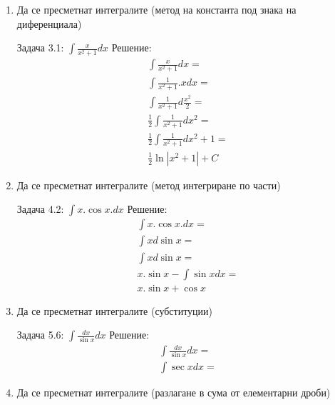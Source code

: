 \documentclass[a4paper, 20pt, fleqn, border=2pt]{article}
\begin{document}
\begin{enumerate}
    \item Да се пресметнат интегралите (метод на константа под знака на диференциала)
\par
\par

Задача 3.1: $\int\frac{x}{x^2 + 1}dx$
Решение:
\begin{equation}
\begin{split}
    \int\frac{x}{x^2 + 1}dx = \\
    \int\frac{1}{x^2 + 1}.xdx = \\
    \int\frac{1}{x^2 + 1}d\frac{x^2}{2} = \\
    \frac{1}{2}\int\frac{1}{x^2 + 1}dx^2 = \\
    \frac{1}{2}\int\frac{1}{x^2 + 1}dx^2 + 1 = \\
    \frac{1}{2}\ln{|x^2 + 1|} + C
\end{split}
\end{equation}


    \item Да се пресметнат интегралите (метод интегриране по части)
\par
\par

Задача 4.2: $\int x.\cos{x}.dx$
Решение:
\begin{equation}
\begin{split}
    \int x.\cos{x}.dx = \\
    \int x d\sin{x} = \\
    \int x d\sin{x} = \\
    x.\sin{x} - \int \sin{x}dx = \\
    x.\sin{x} + \cos{x} 
\end{split}
\end{equation}

    \item Да се пресметнат интегралите (субституции)
\par
\par

Задача 5.6: $\int \frac{dx}{\sin{x}}dx$
Решение:
\begin{equation}
\begin{split}
    \int \frac{dx}{\sin{x}}dx = \\
    \int \sec{x}dx = 
\end{split}
\end{equation}

    \item Да се пресметнат интегралите (разлагане в сума от елементарни дроби)
\par
\par


\end{enumerate}
\end{document}
